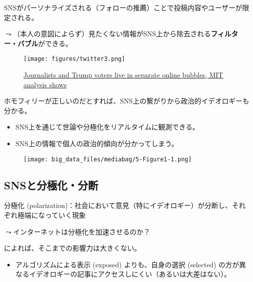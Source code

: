 \documentclass[
  xelatex,
  ja=standard]{bxjsarticle}
\providecommand{\tightlist}{%
  \setlength{\itemsep}{0pt}\setlength{\parskip}{0pt}}\usepackage{longtable,booktabs,array}
\begin{document}
SNSがパーソナライズされる（フォローの推薦）ことで投稿内容やユーザーが限定される。

\(\leadsto\)（本人の意図によらず）見たくない情報がSNS上から除去される\textbf{フィルター・バブル}ができる。

\begin{figure}[htpb]

{\centering \texttt{[image: figures/twitter3.png]}

}

\caption{\href{https://www.vice.com/en/article/d3xamx/journalists-and-trump-voters-live-in-separate-online-bubbles-mit-analysis-shows}{Journalists
and Trump voters live in separate online bubbles, MIT analysis shows}}

\end{figure}

ホモフィリーが正しいのだとすれば、SNS上の繋がりから政治的イデオロギーも分かる。

\begin{itemize}
\tightlist
\item
  SNS上を通じて世論や分極化をリアルタイムに観測できる。
\item
  SNS上の情報で個人の政治的傾向が分かってしまう。
\end{itemize}

\begin{figure}[htpb]

{\centering \texttt{[image: big\_data\_files/mediabag/5-Figure1-1.png]}

}

\caption{\citet{barbera2015}}

\end{figure}

\hypertarget{snsux3068ux5206ux6975ux5316ux5206ux65ad}{%
\subsection{SNSと分極化・分断}\label{snsux3068ux5206ux6975ux5316ux5206ux65ad}}

分極化
(polarization)：社会において意見（特にイデオロギー）が分断し、それぞれ極端になっていく現象

\(\leadsto\)インターネットは分極化を加速させるのか？

\citet[第5章]{inamasu2022}によれば、そこまでの影響力は大きくない。

\begin{itemize}
\tightlist
\item
  アルゴリズムによる表示 (exposed) よりも、自身の選択 (selected)
  の方が異なるイデオロギーの記事にアクセスしにくい（あるいは大差はない）。
\end{itemize}
\end{document}
